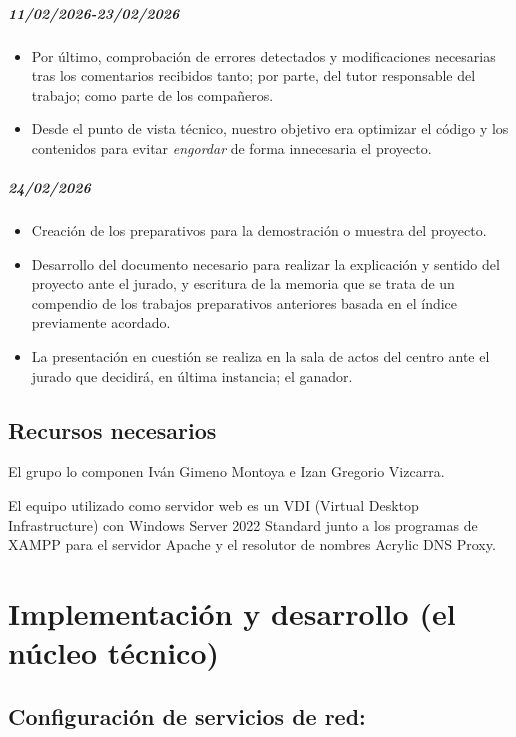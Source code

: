 \documentclass[11.5pt]{article}
\begin{document}
	\subparagraph*{11/02/2026-23/02/2026}
	
	\begin{itemize}
		\item Por último, comprobación de errores detectados y modificaciones necesarias tras los comentarios recibidos tanto; por parte, del tutor responsable del trabajo; como parte de los compañeros.
		\item 	Desde el punto de vista técnico, nuestro objetivo era optimizar el código y los contenidos para evitar \textit{engordar} de forma innecesaria el proyecto.
	\end{itemize}
	
	\subparagraph*{24/02/2026}
	
	\begin{itemize}
		\item Creación de los preparativos para la demostración o muestra del proyecto.
		\item 	Desarrollo del documento necesario para realizar la explicación y sentido del proyecto ante el jurado, y escritura de la memoria que se trata de un compendio de los trabajos preparativos anteriores basada en el índice previamente acordado.
		\item 	La presentación en cuestión se realiza en la sala de actos del centro ante el jurado que decidirá, en última instancia; el ganador.
	\end{itemize}
	
	\subsection{Recursos necesarios}
	
	El grupo lo componen Iván Gimeno Montoya e Izan Gregorio Vizcarra.
	
	El equipo utilizado como servidor web es un VDI (Virtual Desktop Infrastructure) con Windows Server 2022 Standard junto a los programas de XAMPP para el servidor Apache y el resolutor de nombres Acrylic DNS Proxy.
	
	\section{Implementación y desarrollo (el núcleo técnico)}
	
	\subsection{Configuración de servicios de red:}
	
\end{document}
